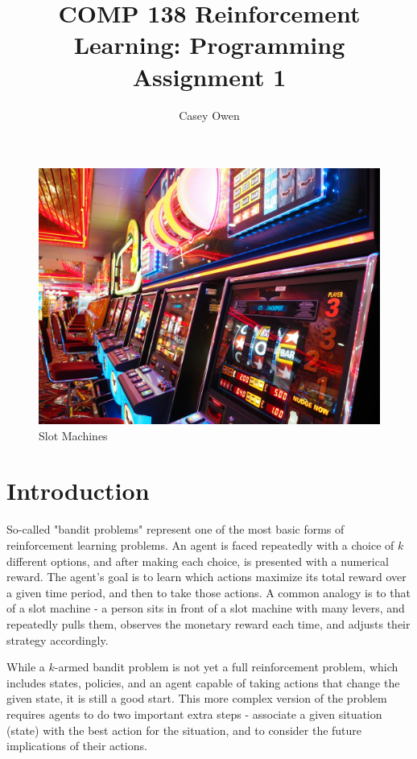 \documentclass{article}
\title{COMP 138 Reinforcement Learning: Programming Assignment 1}
\author{Casey Owen}
\begin{document}
\maketitle

\begin{figure}[h]
\centering
\includegraphics[scale=0.125]{Slot Machines.jpg}
\caption{Slot Machines \citep{unsplash_photo_2020}}
\label{fig:slot machines}
\end{figure}

\section{Introduction}
So-called "bandit problems" represent one of the most basic forms of reinforcement learning problems. An agent is faced repeatedly with a choice of $k$ different options, and after making each choice, is presented with a numerical reward. The agent's goal is to learn which actions maximize its total reward over a given time period, and then to take those actions. A common analogy is to that of a slot machine - a person sits in front of a slot machine with many levers, and repeatedly pulls them, observes the monetary reward each time, and adjusts their strategy accordingly.

While a $k$-armed bandit problem is not yet a full reinforcement problem, which includes states, policies, and an agent capable of taking actions that change the given state, it is still a good start. This more complex version of the problem requires agents to do two important extra steps - associate a given situation (state) with the best action for the situation, and to consider the future implications of their actions. 
\end{document}
